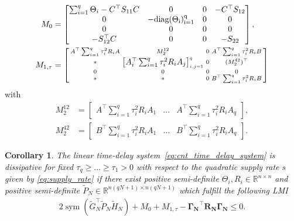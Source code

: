 \documentclass[12pt]{article}
\DeclareMathOperator{\sym}{sym}
\newtheorem{corollary}{Corollary}
\begin{document}
\begin{align*}
 M_0 &=
\begin{bmatrix}
       \sum_{i=1}^q \Theta_i - C^\top S_{11}C & 0 &0&-C^\top S_{12}\\
       0& - \rm diag(\Theta_i)_{i=1}^q & 0 &0  \\ 0&0&0&0\\
       -S_{12}^\top C&0&0&-S_{22}
\end{bmatrix},\\ 
M_{1,\tau}&=\left[\begin{smallmatrix}
  A^\top \sum_{i=1}^q \tau_i^2 R_i A & M_2^{12}& 0  &  A^\top \sum_{i=1}^q \tau_i^2 R_i  B \\
 *&  \begin{bmatrix}
A_i^\top  \sum_{i=1}^q \tau_i^2 R_i  A_j  
 \end{bmatrix}_{i,j=1}^q& 0 &(M_2^{42})^\top \\
 0&  0&0& 0\\
 *& 
*&0 &B^\top   \sum_{i=1}^q \tau_i^2 R_i  B 
\end{smallmatrix}\right]
\end{align*}
with
\begin{align*}M_2^{12}&= \begin{bmatrix}
 A^\top \sum_{i=1}^q \tau_i^2 R_i  A_1 &  \ldots &  A^\top \sum_{i=1}^q \tau_i^2 R_i  A_q 
\end{bmatrix}, \\ M_2^{42}&=\begin{bmatrix}
B^\top   \sum_{i=1}^q \tau_i^2 R_i  A_1 &  \ldots & B^\top  \sum_{i=1}^q \tau_i^2 R_i A_q 
 \end{bmatrix}.
\end{align*}
\begin{corollary}\rm
The linear time-delay system~\eqref{eq:cnt_time_delay_system} is dissipative for fixed $\tau_q\geq \ldots \geq \tau_1 > 0$ with respect to the quadratic supply rate $s$ given by \eqref{eq:supply_rate} if there exist positive semi-definite $\Theta_i,R_i\in\mathbb{R}^{n\times n}$ and positive semi-definite $\tilde P_N\in\mathbb{R}^{n(qN+1)\times n(qN+1)}$ which fulfill the following LMI
\begin{align}
\label{eq:LMI_fixed_tau}    
2 {\sym}( \tilde G_{N}^\top \tilde P_N \tilde H_{N})+ M_0 +M_{1,\tau}-\mathbf{\Gamma_N}^\top \mathbf{R_N}\mathbf{\Gamma_N}\leq 0.
\end{align}
\end{corollary}
\end{document}
